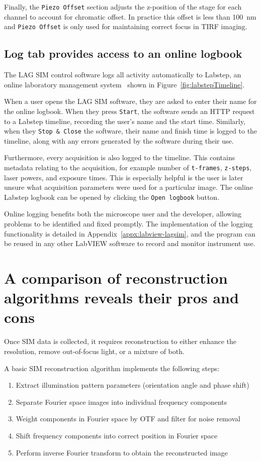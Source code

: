 Finally, the \texttt{Piezo Offset} section adjusts the z-position of the stage for each channel to account for chromatic offset.
In practice this offset is less than \SI{100}{\nano\meter} and \texttt{Piezo Offset} is only used for maintaining correct focus in TIRF imaging.

\subsection{Log tab provides access to an online logbook}
The LAG SIM control software logs all activity automatically to Labstep, an online laboratory management system~\cite{labstep} shown in Figure~\ref{fig:labstepTimeline}.

When a user opens the LAG SIM software, they are asked to enter their name for the online logbook.
When they press \texttt{Start}, the software sends an HTTP request to a Labstep timeline,  recording the user's name and the start time.
Similarly, when they \texttt{Stop \& Close} the software, their name and finish time is logged to the timeline, along with any errors generated by the software during their use.

Furthermore, every acquisition is also logged to the timeline.
This contains metadata relating to the acquisition, for example number of \texttt{t-frames}, \texttt{z-steps}, laser powers, and exposure times.
This is especially helpful is the user is later unsure what acquisition parameters were used for a particular image.
The online Labstep logbook can be opened by clicking the \texttt{Open logbook} button.

Online logging benefits both the microscope user and the developer, allowing problems to be identified and fixed promptly.
The implementation of the logging functionality is detailed in Appendix~\ref{appx:labview-lagsim}, and the program can be reused in any other LabVIEW software to record and monitor instrument use. 

\section{A comparison of reconstruction algorithms reveals their pros and cons} \label{sec:recon}
Once SIM data is collected, it requires reconstruction to either enhance the resolution, remove out-of-focus light, or a mixture of both.

A basic SIM reconstruction algorithm implements the following steps:
\begin{enumerate}
	\item Extract illumination pattern parameters (orientation angle and phase shift)
	\item Separate Fourier space images into individual frequency components
	\item \label{step:filterPreShift}Weight components in Fourier space by OTF and filter for noise removal
	\item \label{step:shiftComponents}Shift frequency components into correct position in Fourier space
	\item Perform inverse Fourier transform to obtain the reconstructed image
\end{enumerate}

